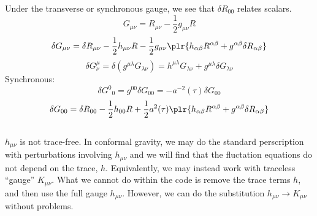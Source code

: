 \documentclass[10pt,letterpaper]{article}
\begin{document}
\ea
Under the transverse or synchronous gauge, we see that $\delta R_{00}$ relates scalars. 
\[
	G_{\mu\nu} = R_{\mu\nu} - \frac12 g_{\mu\nu}R
\]
\[
	\delta G_{\mu\nu} = \delta R_{\mu\nu} - \frac12 h_{\mu\nu}R - \frac12 g_{\mu\nu}\plr{
	h_{\alpha\beta}R^{\alpha\beta} + g^{\alpha\beta}\delta R_{\alpha\beta}}
\]
\[
	\delta G^{\mu}_{\nu} = \delta( g^{\mu\lambda}G_{\lambda\nu}) = h^{\mu\lambda}G_{\lambda\nu}
	+ g^{\mu\lambda}\delta G_{\lambda\nu}
\]
Synchronous:
\[
	\delta G^0{}_0 = g^{00}\delta G_{00} = -a^{-2}(\tau)\delta G_{00}
\]
\[	
	\delta G_{00} = \delta R_{00} - \frac12 h_{00}R + \frac12 a^2(\tau)\plr{ h_{\alpha\beta}R^{\alpha\beta}
	+g^{\alpha\beta}\delta R_{\alpha\beta}}
\]
\\
$h_{\mu\nu}$ is not trace-free. In conformal gravity, we may do the standard perscription with perturbations involving $h_{\mu\nu}$ and we will find that the fluctation equations do not depend on the trace, $h$. Equivalently, we may instead work with traceless ``gauge'' $K_{\mu\nu}$. What we cannot do within the code is remove the trace terms $h$, and then use the full gauge $h_{\mu\nu}$. However, we can do the substitution $h_{\mu\nu} \to K_{\mu\nu}$ without problems. 
\end{document}
